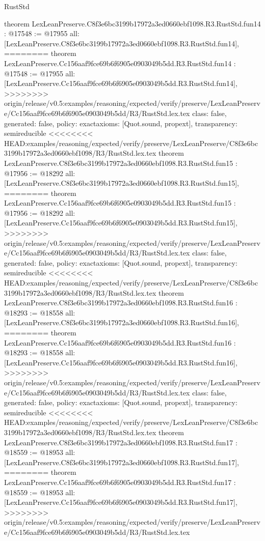 \begin{lexlean}{RustStd}
\begin{coremodule}
{\begin{coremodule}
{{{{{{{{{{{{{{{{theorem LexLeanPreserve.C8f3e6bc3199b17972a3ed0660ebf1098.R3.RustStd.fun14 : @17548 := @17955 {
  all: [LexLeanPreserve.C8f3e6bc3199b17972a3ed0660ebf1098.R3.RustStd.fun14],
========
theorem LexLeanPreserve.Cc156aaf9fce69b6f6905e0903049b5dd.R3.RustStd.fun14 : @17548 := @17955 {
  all: [LexLeanPreserve.Cc156aaf9fce69b6f6905e0903049b5dd.R3.RustStd.fun14],
>>>>>>>> origin/release/v0.5:examples/reasoning/expected/verify/preserve/LexLeanPreserve/Cc156aaf9fce69b6f6905e0903049b5dd/R3/RustStd.lex.tex
  class: false,
  generated: false,
  policy: exact{axioms: [Quot.sound, propext]},
  transparency: semireducible
}
<<<<<<<< HEAD:examples/reasoning/expected/verify/preserve/LexLeanPreserve/C8f3e6bc3199b17972a3ed0660ebf1098/R3/RustStd.lex.tex
theorem LexLeanPreserve.C8f3e6bc3199b17972a3ed0660ebf1098.R3.RustStd.fun15 : @17956 := @18292 {
  all: [LexLeanPreserve.C8f3e6bc3199b17972a3ed0660ebf1098.R3.RustStd.fun15],
========
theorem LexLeanPreserve.Cc156aaf9fce69b6f6905e0903049b5dd.R3.RustStd.fun15 : @17956 := @18292 {
  all: [LexLeanPreserve.Cc156aaf9fce69b6f6905e0903049b5dd.R3.RustStd.fun15],
>>>>>>>> origin/release/v0.5:examples/reasoning/expected/verify/preserve/LexLeanPreserve/Cc156aaf9fce69b6f6905e0903049b5dd/R3/RustStd.lex.tex
  class: false,
  generated: false,
  policy: exact{axioms: [Quot.sound, propext]},
  transparency: semireducible
}
<<<<<<<< HEAD:examples/reasoning/expected/verify/preserve/LexLeanPreserve/C8f3e6bc3199b17972a3ed0660ebf1098/R3/RustStd.lex.tex
theorem LexLeanPreserve.C8f3e6bc3199b17972a3ed0660ebf1098.R3.RustStd.fun16 : @18293 := @18558 {
  all: [LexLeanPreserve.C8f3e6bc3199b17972a3ed0660ebf1098.R3.RustStd.fun16],
========
theorem LexLeanPreserve.Cc156aaf9fce69b6f6905e0903049b5dd.R3.RustStd.fun16 : @18293 := @18558 {
  all: [LexLeanPreserve.Cc156aaf9fce69b6f6905e0903049b5dd.R3.RustStd.fun16],
>>>>>>>> origin/release/v0.5:examples/reasoning/expected/verify/preserve/LexLeanPreserve/Cc156aaf9fce69b6f6905e0903049b5dd/R3/RustStd.lex.tex
  class: false,
  generated: false,
  policy: exact{axioms: [Quot.sound, propext]},
  transparency: semireducible
}
<<<<<<<< HEAD:examples/reasoning/expected/verify/preserve/LexLeanPreserve/C8f3e6bc3199b17972a3ed0660ebf1098/R3/RustStd.lex.tex
theorem LexLeanPreserve.C8f3e6bc3199b17972a3ed0660ebf1098.R3.RustStd.fun17 : @18559 := @18953 {
  all: [LexLeanPreserve.C8f3e6bc3199b17972a3ed0660ebf1098.R3.RustStd.fun17],
========
theorem LexLeanPreserve.Cc156aaf9fce69b6f6905e0903049b5dd.R3.RustStd.fun17 : @18559 := @18953 {
  all: [LexLeanPreserve.Cc156aaf9fce69b6f6905e0903049b5dd.R3.RustStd.fun17],
>>>>>>>> origin/release/v0.5:examples/reasoning/expected/verify/preserve/LexLeanPreserve/Cc156aaf9fce69b6f6905e0903049b5dd/R3/RustStd.lex.tex
}}}}}}}}}}}}}}}}}}}}}
\end{coremodule}}
\end{coremodule}
\end{lexlean}
